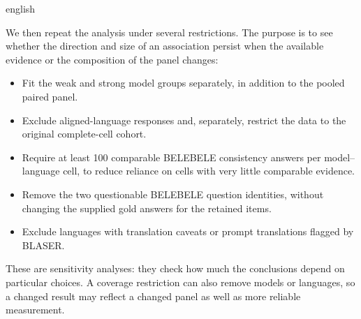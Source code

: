 \begin{otherlanguage*}{english}

We then repeat the analysis under several restrictions. The purpose is to see whether the direction and size of an association persist when the available evidence or the composition of the panel changes:
\begin{itemize}
    \item Fit the weak and strong model groups separately, in addition to the pooled paired panel.
    \item Exclude aligned-language responses and, separately, restrict the data to the original complete-cell cohort.
    \item Require at least 100 comparable BELEBELE consistency answers per model--language cell, to reduce reliance on cells with very little comparable evidence.
    \item Remove the two questionable BELEBELE question identities, without changing the supplied gold answers for the retained items.
    \item Exclude languages with translation caveats or prompt translations flagged by BLASER.
\end{itemize}

These are sensitivity analyses: they check how much the conclusions depend on particular choices. A coverage restriction can also remove models or languages, so a changed result may reflect a changed panel as well as more reliable measurement.



\end{otherlanguage*}
